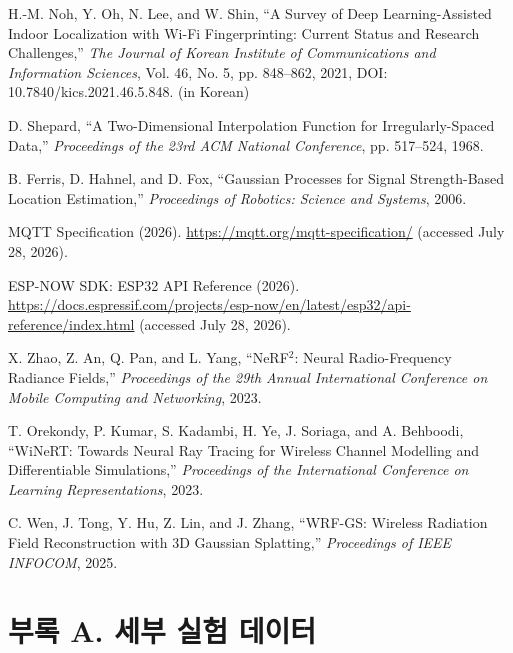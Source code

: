 \documentclass[11pt,a4paper]{article}
\begin{document}
\begin{enumerate}[label={[\arabic*]}, leftmargin=2.6em, labelsep=0.6em, itemsep=3pt, topsep=4pt]
  \item H.-M. Noh, Y. Oh, N. Lee, and W. Shin, ``A Survey of Deep Learning-Assisted Indoor Localization with Wi-Fi Fingerprinting: Current Status and Research Challenges,'' \textit{The Journal of Korean Institute of Communications and Information Sciences}, Vol. 46, No. 5, pp. 848--862, 2021, DOI: 10.7840/kics.2021.46.5.848. (in Korean)
  \item D. Shepard, ``A Two-Dimensional Interpolation Function for Irregularly-Spaced Data,'' \textit{Proceedings of the 23rd ACM National Conference}, pp. 517--524, 1968.
  \item B. Ferris, D. Hahnel, and D. Fox, ``Gaussian Processes for Signal Strength-Based Location Estimation,'' \textit{Proceedings of Robotics: Science and Systems}, 2006.
  \item MQTT Specification (2026). \url{https://mqtt.org/mqtt-specification/} (accessed July 28, 2026).
  \item ESP-NOW SDK: ESP32 API Reference (2026). \url{https://docs.espressif.com/projects/esp-now/en/latest/esp32/api-reference/index.html} (accessed July 28, 2026).
  \item X. Zhao, Z. An, Q. Pan, and L. Yang, ``NeRF$^2$: Neural Radio-Frequency Radiance Fields,'' \textit{Proceedings of the 29th Annual International Conference on Mobile Computing and Networking}, 2023.
  \item T. Orekondy, P. Kumar, S. Kadambi, H. Ye, J. Soriaga, and A. Behboodi, ``WiNeRT: Towards Neural Ray Tracing for Wireless Channel Modelling and Differentiable Simulations,'' \textit{Proceedings of the International Conference on Learning Representations}, 2023.
  \item C. Wen, J. Tong, Y. Hu, Z. Lin, and J. Zhang, ``WRF-GS: Wireless Radiation Field Reconstruction with 3D Gaussian Splatting,'' \textit{Proceedings of IEEE INFOCOM}, 2025.
\end{enumerate}

\clearpage
\setcounter{table}{0}
\renewcommand{\thetable}{A\arabic{table}}

\section*{부록 A. 세부 실험 데이터}
\end{document}
